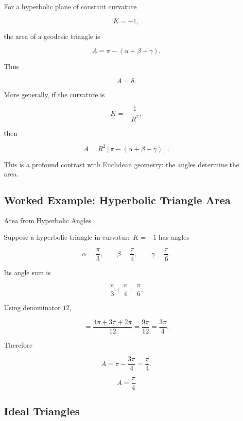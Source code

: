 For a hyperbolic plane of constant curvature

\[
K=-1,
\]

the area of a geodesic triangle is

\[
\boxed{
A
=
\pi-(\alpha+\beta+\gamma).
}
\]

Thus

\[
\boxed{
A=\delta.
}
\]

More generally, if the curvature is

\[
K=-\frac{1}{R^2},
\]

then

\[
\boxed{
A
=
R^2
\left[
\pi-(\alpha+\beta+\gamma)
\right].
}
\]

This is a profound contrast with Euclidean geometry: the angles determine the
area.

\subsection{Worked Example: Hyperbolic Triangle Area}
\label{subsec:worked-hyperbolic-triangle-area}

\begin{workedexamplebox}{Area from Hyperbolic Angles}

Suppose a hyperbolic triangle in curvature \(K=-1\) has angles

\[
\alpha=\frac{\pi}{3},
\qquad
\beta=\frac{\pi}{4},
\qquad
\gamma=\frac{\pi}{6}.
\]

Its angle sum is

\[
\frac{\pi}{3}
+
\frac{\pi}{4}
+
\frac{\pi}{6}.
\]

Using denominator \(12\),

\[
=
\frac{4\pi+3\pi+2\pi}{12}
=
\frac{9\pi}{12}
=
\frac{3\pi}{4}.
\]

Therefore

\[
A
=
\pi-\frac{3\pi}{4}
=
\frac{\pi}{4}.
\]

\begin{answerbox}
\[
\boxed{A=\frac{\pi}{4}}
\]
\end{answerbox}
\end{workedexamplebox}

\subsection{Ideal Triangles}
\label{subsec:ideal-hyperbolic-triangles}

